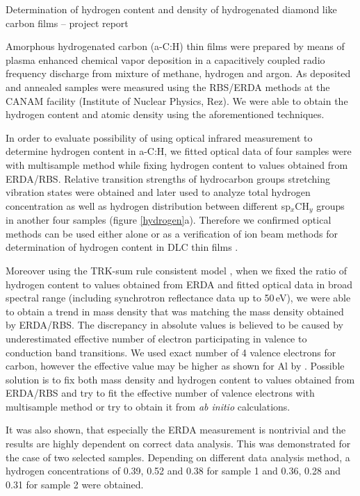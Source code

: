 \documentclass[10pt]{article}
\begin{document}
\pagestyle{empty}

\begin{center}
\LARGE{Determination of hydrogen content and density of hydrogenated diamond like carbon films -- project report}
\end{center}
\vspace{0.2cm}

Amorphous hydrogenated carbon (a-C:H) thin films were prepared by means of plasma enhanced chemical vapor deposition in a capacitively coupled radio frequency discharge from mixture of methane, hydrogen and argon.
As deposited and annealed samples were measured using the RBS/ERDA methods at the CANAM facility (Institute of Nuclear Physics, Rez).
We were able to obtain the hydrogen content and atomic density using the aforementioned techniques.

In order to evaluate possibility of using optical infrared measurement to determine hydrogen content in a-C:H, we fitted optical data of four samples were with multisample method while fixing hydrogen content to values obtained from ERDA/RBS. Relative transition strengths of hydrocarbon groups stretching vibration states were obtained and later used to analyze total hydrogen concentration as well as hydrogen distribution between different sp$_x$CH$_y$ groups in another four samples (figure \ref{hydrogen}a). Therefore we confirmed optical methods can be used either alone or as a verification of ion beam methods for determination of hydrogen content in DLC thin films \cite{Ondracka2013}. 

Moreover using the TRK-sum rule consistent model \cite{Franta2013432}, when we fixed the ratio of hydrogen content to values obtained from ERDA and fitted optical data in broad spectral range (including synchrotron reflectance data up to 50\,eV), we were able to obtain a trend in mass density that was matching the mass density obtained by ERDA/RBS.
The discrepancy in absolute values is believed to be caused by underestimated effective number of electron participating in valence to conduction band transitions.
We used exact number of 4 valence electrons for carbon, however the effective value may be higher as shown for Al by \citet{Shiles1980}.
Possible solution is to fix both mass density and hydrogen content to values obtained from ERDA/RBS and try to fit the effective number of valence electrons with multisample method or try to obtain it from \textit{ab initio} calculations.

It was also shown, that especially the ERDA measurement is nontrivial and the results are highly dependent on correct data analysis. This was demonstrated for the case of two selected samples. Depending on different data analysis method, a hydrogen concentrations of 0.39, 0.52 and 0.38 for sample 1 and 0.36, 0.28 and 0.31 for sample 2 were obtained. 
\end{document}

